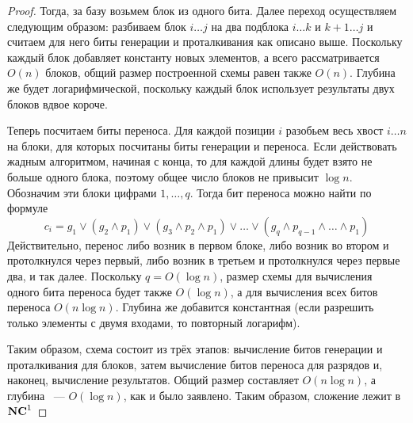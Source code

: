 \begin{proof}
Тогда, за базу возьмем блок из одного бита. Далее переход осуществляем следующим образом: разбиваем блок $i\ldots j$ на два подблока $i\ldots k$ и $k+1 \ldots j$ и считаем для него биты генерации и проталкивания как описано выше. 
Поскольку каждый блок добавляет константу новых элементов, а всего рассматривается $O(n)$ блоков, общий размер построенной схемы равен также $O(n)$. Глубина же будет логарифмической, поскольку каждый блок использует результаты двух блоков вдвое короче. 

Теперь посчитаем биты переноса. Для каждой позиции $i$ разобьем весь хвост $i \ldots n$ на блоки, для которых посчитаны биты генерации и переноса. Если действовать жадным алгоритмом, начиная с конца, то для каждой длины будет взято не больше одного блока, поэтому общее число блоков не привысит $\log n$. Обозначим эти блоки цифрами $1, \ldots, q$. Тогда бит переноса можно найти по формуле $$c_i = g_1 \vee (g_2 \wedge p_1) \vee (g_3 \wedge p_2 \wedge p_1) \vee \ldots \vee (g_q \wedge p_{q-1} \wedge \ldots \wedge p_1)$$
Действительно, перенос либо возник в первом блоке, либо возник во втором и протолкнулся через первый, либо возник в третьем и
протолкнулся через первые два, и так далее. Поскольку $q = O(\log n)$, размер схемы для вычисления одного бита переноса будет также $O(\log n)$, а для вычисления всех битов переноса $O(n\log n)$. Глубина же добавится константная (если разрешить только элементы с двумя входами, то повторный логарифм).

Таким образом, схема состоит из трёх этапов: вычисление битов генерации и проталкивания для блоков, затем вычисление битов переноса для разрядов и, наконец, вычисление результатов. Общий размер составляет $O(n\log n)$, а глубина ~--- $O(\log n)$, как и было заявлено. Таким образом, сложение лежит в $\textbf{NC}^1$ \end{proof}